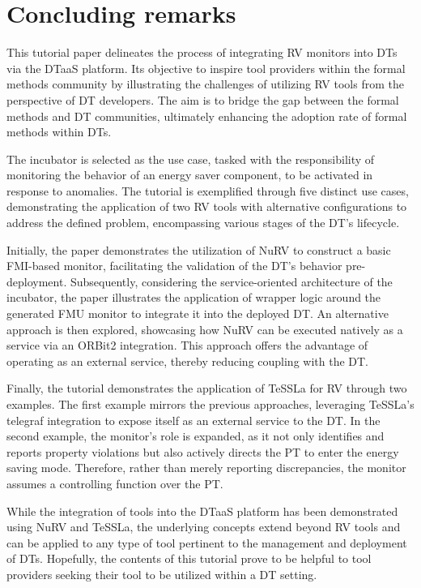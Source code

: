 \section{Concluding remarks} \label{sec:conclude}

This tutorial paper delineates the process of integrating RV monitors into DTs via the DTaaS platform.
Its objective to inspire tool providers within the formal methods community by illustrating the challenges of utilizing RV tools from the perspective of DT developers.
The aim is to bridge the gap between the formal methods and DT communities, ultimately enhancing the adoption rate of formal methods within DTs.

The incubator \cite{Feng&21c} is selected as the use case, tasked with the responsibility of monitoring the behavior of an energy saver component, to be activated in response to anomalies.
The tutorial is exemplified through five distinct use cases, demonstrating the application of two RV tools with alternative configurations to address the defined problem, encompassing various stages of the DT's lifecycle.

Initially, the paper demonstrates the utilization of NuRV to construct a basic FMI-based monitor, facilitating the validation of the DT's behavior pre-deployment.
Subsequently, considering the service-oriented architecture of the incubator, the paper illustrates the application of wrapper logic around the generated FMU monitor to integrate it into the deployed DT.
An alternative approach is then explored, showcasing how NuRV can be executed natively as a service via an ORBit2 integration.
This approach offers the advantage of operating as an external service, thereby reducing coupling with the DT.

Finally, the tutorial demonstrates the application of TeSSLa for RV through two examples.
The first example mirrors the previous approaches, leveraging TeSSLa's telegraf integration to expose itself as an external service to the DT.
In the second example, the monitor's role is expanded, as it not only identifies and reports property violations but also actively directs the PT to enter the energy saving mode.
Therefore, rather than merely reporting discrepancies, the monitor assumes a controlling function over the PT.

While the integration of tools into the DTaaS platform has been demonstrated using NuRV and TeSSLa, the underlying concepts extend beyond RV tools and can be applied to any type of tool pertinent to the management and deployment of DTs.
Hopefully, the contents of this tutorial prove to be helpful to tool providers seeking their tool to be utilized within a DT setting.
